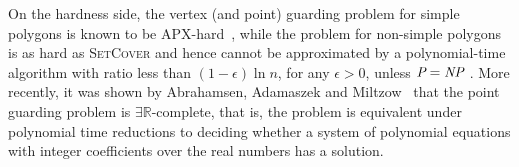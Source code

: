 \documentclass[a4paper,11pt]{article}
\def\RR{\mathbb R}
\def\cF{\mathcal F}
\begin{document}



On the hardness side, the vertex (and point) guarding problem for simple polygons is known to be APX-hard~\cite{ESW01}, while the problem for non-simple polygons is as hard as \textsc{SetCover} and hence cannot be approximated by a polynomial-time algorithm with ratio less than %
$(1-\epsilon)\ln n$, for any $\epsilon>0$, unless $\text{\it P}=\text{\it NP}$ \cite{DS14}.
More recently, it was shown by Abrahamsen, Adamaszek and Miltzow~\cite{AAM22} that the point guarding problem is $\exists\RR$-complete, that is, the problem is equivalent under polynomial time reductions to deciding whether a system of polynomial equations with integer coefficients over the real numbers has a solution.
\end{document}
